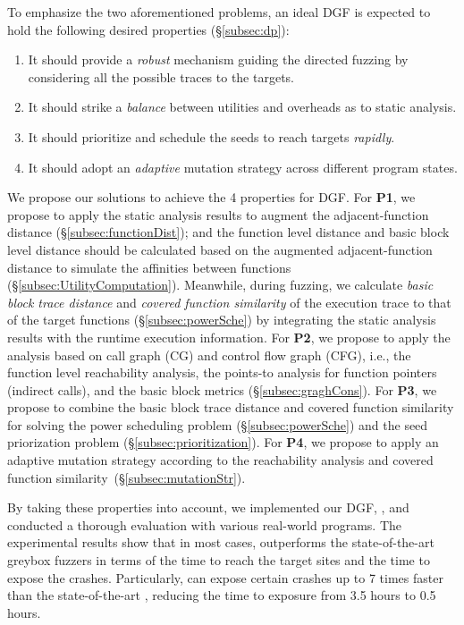 To emphasize the two aforementioned problems, an ideal DGF is expected to hold the following desired properties (\S\ref{subsec:dp}):
\begin{enumerate}[\textbf{P}1]
\itemsep0em 
\item It should provide a \emph{robust} mechanism guiding the directed fuzzing by considering all the possible traces to the targets.
\item It should strike a \emph{balance} between utilities and overheads as to static analysis.
\item It should prioritize and schedule the seeds to reach targets \emph{rapidly}.
\item It should adopt an \emph{adaptive} mutation strategy across different program states.
\end{enumerate}


We propose our solutions to achieve the 4 properties for DGF. 
For \textbf{P1}, we propose to apply the static analysis results to augment the adjacent-function distance (\S\ref{subsec:functionDist}); and the function level distance and basic block level distance should be calculated based on the augmented adjacent-function distance to simulate the affinities between functions (\S\ref{subsec:UtilityComputation}).
Meanwhile, during fuzzing, we calculate \emph{basic block trace distance} and \emph{covered function similarity} of the execution trace to that of the target functions (\S\ref{subsec:powerSche}) by integrating the static analysis results with the runtime execution information.
For \textbf{P2}, we propose to apply the analysis based on call graph (CG) and control flow graph (CFG), i.e., the function level reachability analysis, the points-to analysis for function pointers (indirect calls), and the basic block metrics (\S\ref{subsec:graghCons}). 
For \textbf{P3}, we propose to combine the basic block trace distance and covered function similarity for solving the power scheduling problem (\S\ref{subsec:powerSche}) and the seed priorization problem (\S\ref{subsec:prioritization}). 
For \textbf{P4}, we propose to apply an adaptive mutation strategy according to the reachability analysis and covered function similarity~(\S\ref{subsec:mutationStr}).

By taking these properties into account, we implemented our DGF, {\dFOT}, and conducted a thorough evaluation with various real-world programs. 
The experimental results show that in most cases, {\dFOT} outperforms the state-of-the-art greybox fuzzers in terms of the time to reach the target sites and the time to expose the crashes.
Particularly, {\dFOT} can expose certain crashes up to 7 times faster than the state-of-the-art \aflgo, reducing the time to exposure from 3.5 hours to 0.5 hours.

